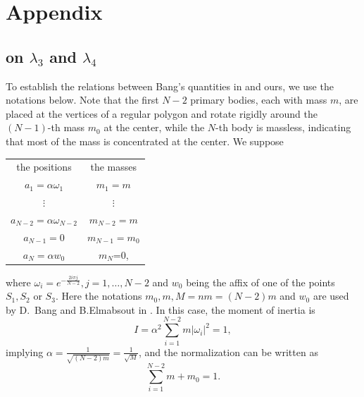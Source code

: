 \documentclass[11pt]{article}
\begin{document}
\appendix
\setcounter{equation}{0}
\section{Appendix}\label{sec:5}


\subsection{on 
    \texorpdfstring{$\lambda_3$}{lambda\_3} and 
    \texorpdfstring{$\lambda_4$}{lambda\_4}}

To establish the relations between Bang's quantities in \cite{BaE}
and ours, we use the notations below. Note that the first \(N-2\) primary bodies, each with mass \(m\), are placed at the vertices of a regular polygon and rotate rigidly around the \((N-1)\)-th mass \(m_0\) at the center, while the \(N\)-th body is massless, indicating that most of the mass is concentrated at the center.
We suppose
 \begin{center}
 	\begin{tabular}{c c}
 		the positions & the masses\\
 		$a_{1}=\alpha \omega_{1}$                        &$m_1=m$\\
 		$\vdots$                                       &$\vdots$\\
 		$a_{N-2}=\alpha \omega_{N-2}$               &$m_{N-2}=m$\\
 		$a_{N-1}=0$                                 &$m_{N-1}=m_0$\\
 		$a_{N}=\alpha w_{0}$                        &$m_{N}$=0,
 	\end{tabular}
 \end{center}
 where $\omega_i=e^{-\frac{2i\pi j}{N-2}}, j=1, \ldots , N-2$
 and $w_0$ being the affix of one of the points $S_1,S_2$
 or $S_3$.
Here the notations $m_0, m ,M=nm=(N-2)m$ and $w_0$ are used by
D.~Bang and B.Elmabsout in \cite{BaE}. In this case,
 the moment of inertia is
 \begin{displaymath}
 I=\alpha^{2}
 \sum_{i=1}^{N-2}m|\omega_i|^2=1,
 \end{displaymath}
 implying $\alpha =\frac{1}{\sqrt{(N-2)m}}=\frac{1}{\sqrt{M}}$, and 
 the normalization can be written as $$\sum_{i=1}^{N-2}m+m_0=1.$$
 
\end{document}
